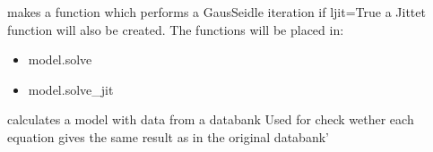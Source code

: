 \documentclass[letterpaper,10pt,english]{sphinxmanual}
\begin{document}
\begin{fulllineitems}

\begin{fulllineitems}
\label{\detokenize{core/modelclass:modelclass.BaseModel.make_res}}
\pysigstartsignatures
{}
\pysigstopsignatures
\sphinxAtStartPar
makes a function which performs a Gaus\sphinxhyphen{}Seidle iteration
if ljit=True a Jittet function will also be created.
The functions will be placed in:
\begin{itemize}
\item {} 
\sphinxAtStartPar
model.solve

\item {} 
\sphinxAtStartPar
model.solve\_jit

\end{itemize}

\end{fulllineitems}


\begin{fulllineitems}
\label{\detokenize{core/modelclass:modelclass.BaseModel.base_res}}
\pysigstartsignatures
{}
\pysigstopsignatures
\sphinxAtStartPar
calculates a model with data from a databank
Used for check wether each equation gives the same result as in the original databank’

\end{fulllineitems}


\end{fulllineitems}

\end{document}
